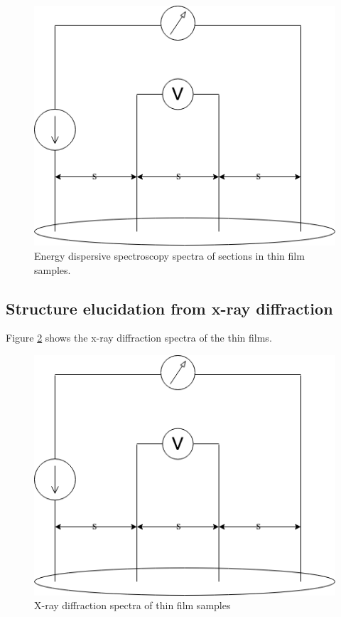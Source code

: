 \begin{figure}
  \centering
  \includegraphics[scale=0.3]{FourPoint.png}
  \caption[EDX spectra of thin films]{Energy dispersive spectroscopy spectra of sections in thin film samples.}
  \label{fig:edx}
\end{figure}

\subsection{Structure elucidation from x-ray diffraction}

Figure \ref{fig:xrd} shows the x-ray diffraction spectra of the thin films.

\begin{figure}
  \centering
  \includegraphics[scale=0.3]{FourPoint.png}
  \caption[XRD spectra of ]{X-ray diffraction spectra of thin film samples}
  \label{fig:xrd}
\end{figure}


